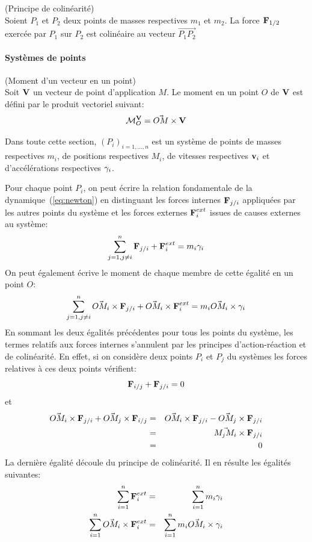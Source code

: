 \begin{mydef}(Principe de colinéarité)\\
  Soient $P_1$ et $P_2$ deux
  points de masses respectives $m_1$ et $m_2$. La force $\vect{F}_{1/2}$
  exercée par $P_1$ sur $P_2$ est colinéaire au vecteur $\vec{P_1P_2}$
\end{mydef}

\paragraph{Systèmes de points}

\begin{mydef}(Moment d'un vecteur en un point)\\
  Soit $\vect{V}$ un vecteur de point d'application $M$. Le moment en
  un point $O$ de $\vect{V}$ est défini par le produit vectoriel
  suivant:
  $$
  \moment{\vect{V}}{O} = \vec{OM} \crossprod \vect{V}
  $$
\end{mydef}

Dans toute cette section, $(P_i)_{i=1,...,n}$ est un système de points de masses respectives $m_i$,
de positions respectives $M_i$, de vitesses respectives $\vi$ et d'accélérations respectives $\gammai$.

Pour chaque point $P_i$, on peut écrire la relation fondamentale de la
dynamique~(\ref{eq:newton}) en distinguant les forces internes
$\vect{F}_{j/i}$ appliquées par les autres points du système et les
forces externes $\vect{F}^{ext}_{i}$
issues de causes externes au système:
$$
\sum_{j=1, j\not=i}^n \vect{F}_{j/i} + \vect{F}^{ext}_{i} = m_i
\gammai
$$
On peut également écrive le moment de chaque membre de cette égalité
en un point $O$:
$$
\sum_{j=1, j\not=i}^n \vec{OM_i}\crossprod \vect{F}_{j/i} +
\vec{OM_i}\crossprod\vect{F}^{ext}_{i} = m_i \vec{OM_i}\crossprod \gammai
$$
En sommant les deux égalités précédentes pour tous les points du
système, les termes relatifs aux forces internes s'annulent par les
principes d'action-réaction et de colinéarité. En effet, si on
considère deux points $P_i$ et $P_j$ du systèmes les forces relatives
à ces deux points vérifient:
$$
\vect{F}_{i/j} + \vect{F}_{j/i} = 0
$$
et
\begin{eqnarray*}
\vec{OM_i}\crossprod \vect{F}_{j/i} + \vec{OM_j}\crossprod
\vect{F}_{i/j}&=&
\vec{OM_i}\crossprod \vect{F}_{j/i} - \vec{OM_j}\crossprod
\vect{F}_{j/i} \\
&=&
\vec{M_{j}M_{i}} \crossprod \vect{F}_{j/i} \\
&=& 0
\end{eqnarray*}
La dernière égalité découle du principe de colinéarité.
Il en résulte les égalités suivantes:
\begin{eqnarray}
\label{eq:1}
\sum_{i=1}^n \vect{F}^{ext}_{i} &=& \sum_{i=1}^n m_i \gammai \\
\label{eq:2}
\sum_{i=1}^n \vec{OM_i}\crossprod\vect{F}^{ext}_{i}
&=& \sum_{i=1}^n m_i \vec{OM_i}\crossprod \gammai
\end{eqnarray}

